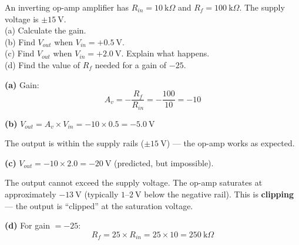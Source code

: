 \begin{diagbox}
\begin{center}
\end{center}
\end{diagbox}

\begin{examplebox}[29.2]
An inverting op-amp amplifier has $R_{in} = 10\ \text{k}\Omega$
and $R_f = 100\ \text{k}\Omega$. The supply
voltage is $\pm 15\ \text{V}$.\\
(a) Calculate the gain.\\
(b) Find $V_{out}$ when $V_{in} = +0.5\ \text{V}$.\\
(c) Find $V_{out}$ when $V_{in} = +2.0\ \text{V}$.
Explain what happens.\\
(d) Find the value of $R_f$ needed for a gain of
$-25$.
\end{examplebox}

\begin{solutionbox}
\textbf{(a)} Gain:
\[
  A_v = -\frac{R_f}{R_{in}}
  = -\frac{100}{10} = -10
\]

\textbf{(b)} $V_{out} = A_v \times V_{in}
= -10 \times 0.5 = -5.0\ \text{V}$

The output is within the supply rails
($\pm 15\ \text{V}$) --- the op-amp works as expected.

\textbf{(c)} $V_{out} = -10 \times 2.0
= -20\ \text{V}$ (predicted, but impossible).

The output cannot exceed the supply voltage. The
op-amp saturates at approximately $-13\ \text{V}$
(typically $1$--$2\ \text{V}$ below the negative
rail). This is \textbf{clipping} --- the output
is ``clipped'' at the saturation voltage.

\textbf{(d)} For gain $= -25$:
\[
  R_f = 25 \times R_{in} = 25 \times 10
  = 250\ \text{k}\Omega
\]
\end{solutionbox}

